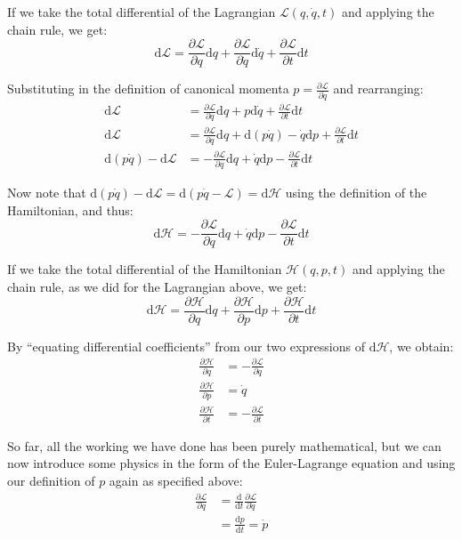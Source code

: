 \documentclass[a4paper]{scrartcl}
\begin{document}
If we take the total differential of the Lagrangian \(\mathcal{L}(q, \dot{q}, t)\) and applying the chain rule, we get:
\[\mathrm{d} \mathcal{L} = \frac{\partial \mathcal{L}}{\partial q} \mathrm{d} q + \frac{\partial \mathcal{L}}{\partial \dot{q}} \mathrm{d} \dot{q} + \frac{\partial \mathcal{L}}{\partial t} \mathrm{d} t\]

Substituting in the definition of canonical momenta \(p = \frac{\partial \mathcal{L}}{\partial \dot{q}}\) and rearranging:
\begin{align*}
    \mathrm{d} \mathcal{L} &= \frac{\partial \mathcal{L}}{\partial q} \mathrm{d} q + p \mathrm{d} \dot{q} + \frac{\partial \mathcal{L}}{\partial t} \mathrm{d} t \\
    \mathrm{d} \mathcal{L} &= \frac{\partial \mathcal{L}}{\partial q} \mathrm{d} q + \mathrm{d}(p \dot{q}) - \dot{q} \mathrm{d} p + \frac{\partial \mathcal{L}}{\partial t} \mathrm{d} t \\
    \mathrm{d}(p \dot{q}) - \mathrm{d} \mathcal{L} &= -\frac{\partial \mathcal{L}}{\partial q} \mathrm{d} q + \dot{q} \mathrm{d} p - \frac{\partial \mathcal{L}}{\partial t} \mathrm{d} t
\end{align*}

Now note that \(\mathrm{d}(p \dot{q}) - \mathrm{d} \mathcal{L} = \mathrm{d}(p \dot{q} - \mathcal{L}) = \mathrm{d} \mathcal{H}\) using the definition of the Hamiltonian, and thus:
\[\mathrm{d} \mathcal{H} = -\frac{\partial \mathcal{L}}{\partial q} \mathrm{d} q + \dot{q} \mathrm{d} p - \frac{\partial \mathcal{L}}{\partial t} \mathrm{d} t\]

If we take the total differential of the Hamiltonian \(\mathcal{H}(q, p, t)\) and applying the chain rule, as we did for the Lagrangian above, we get:
\[\mathrm{d} \mathcal{H} = \frac{\partial \mathcal{H}}{\partial q} \mathrm{d} q + \frac{\partial \mathcal{H}}{\partial p} \mathrm{d} p + \frac{\partial \mathcal{H}}{\partial t} \mathrm{d} t\]

By ``equating differential coefficients'' from our two expressions of \(\mathrm{d} \mathcal{H}\), we obtain:
\begin{align*}
    \frac{\partial \mathcal{H}}{\partial q} &= -\frac{\partial \mathcal{L}}{\partial q} \\
    \frac{\partial \mathcal{H}}{\partial p} &= \dot{q} \\
    \frac{\partial \mathcal{H}}{\partial t} &= -\frac{\partial \mathcal{L}}{\partial t}
\end{align*}

So far, all the working we have done has been purely mathematical, but we can now introduce some physics in the form of the Euler-Lagrange equation and using our definition of \(p\) again as specified above:
\begin{align*}
    \frac{\partial \mathcal{L}}{\partial q} &= \frac{\mathrm{d}}{\mathrm{d} t} \frac{\partial \mathcal{L}}{\partial \dot{q}} \\
    &= \frac{\mathrm{d} p}{\mathrm{d} t} = \dot{p}
\end{align*}
\end{document}
